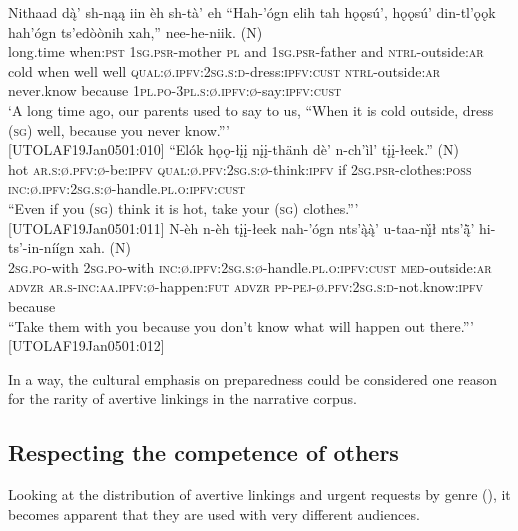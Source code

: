 \documentclass[output=paper,colorlinks,citecolor=brown
]{langscibook}
\begin{document}
\begin{exe}
\ex \label{in-case3}
\begin{xlista}
\ex 
\gll Nithaad dą̀' sh-nąą iin èh sh-tà' eh ``Hah-'ógn elih tah hǫǫsú', hǫǫsú' din-tl'ǫǫk hah'ógn ts'edòònih xah,'' {nee-he-niik. \textnormal{(N)}}\\
long.time when:\textsc{pst} \textsc{1sg.psr}-mother \textsc{pl} and \textsc{1sg.psr}-father and \textsc{ntrl}-outside:\textsc{ar} cold when well well \textsc{qual:ø.ipfv:2sg.s:d}-dress:\textsc{ipfv:cust} \textsc{ntrl}-outside:\textsc{ar} never.know because \textsc{1pl.po-3pl.s:ø.ipfv:ø}-say:\textsc{ipfv:cust} \\
\glt `A long time ago, our parents used to say to us, ``When it is cold outside, dress (\textsc{sg}) well, because you never know.''' \\ \hfill [UTOLAF19Jan0501:010]
\ex 
\gll ``Elók hǫǫ-łįį nįį-thänh dè' n-ch'ìl' {tįį-łeek.'' \textnormal{(N)}}\\
hot \textsc{ar.s:ø.pfv:ø}-be:\textsc{ipfv} \textsc{qual:ø.pfv:2sg.s:ø}-think:\textsc{ipfv} if \textsc{2sg.psr}-clothes:\textsc{poss} \textsc{inc:ø.ipfv:2sg.s:ø}-handle.\textsc{pl.o:ipfv:cust} \\
``Even if you (\textsc{sg}) think it is hot, take your (\textsc{sg}) clothes.''' \\ \hfill [UTOLAF19Jan0501:011]
\ex 
\gll N-èh n-èh tįį-łeek nah-'ógn nts'ą̀ą̀' u-taa-nį̀ł nts'ą̈̀' hi-ts'-in-níígn {xah. \textnormal{(N)}} \\
\textsc{2sg.po}-with \textsc{2sg.po}-with \textsc{inc:ø.ipfv:2sg.s:ø}-handle.\textsc{pl.o:ipfv:cust} \textsc{med}-outside:\textsc{ar} \textsc{advzr} \textsc{ar.s-inc:aa.ipfv:ø}-happen:\textsc{fut} \textsc{advzr} \textsc{pp-pej-ø.pfv:2sg.s:d}-not.know:\textsc{ipfv} because \\
``Take them with you because you don't know what will happen out there.''' \hfill [UTOLAF19Jan0501:012]
\end{xlista}
\end{exe}

In a way, the cultural emphasis on preparedness could be considered one reason for the rarity of avertive linkings in the narrative corpus. 

\subsection{Respecting the competence of others}
\label{subsection:other-avertive}

Looking at the distribution of avertive linkings and urgent requests by genre (), it becomes apparent that they are used with very different audiences.
\end{document}
